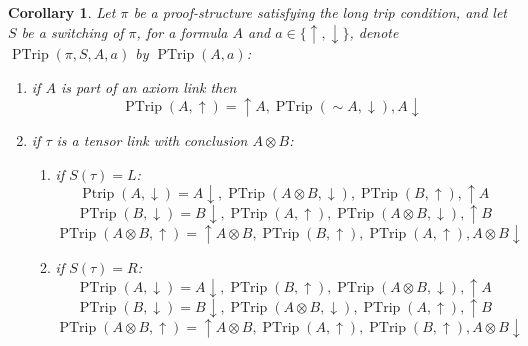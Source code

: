 \documentclass[12pt]{article}
\theoremstyle{plain}
\newtheorem{cor}[thm]{Corollary}
\theoremstyle{definition}
\newcommand{\negation}{\sim}
\begin{document}
\begin{cor}\label{cor:pretrip_innards}
Let $\pi$ be a proof-structure satisfying the long trip condition, and let $S$ be a switching of $\pi$, for a formula $A$ and $a \in \lbrace \uparrow, \downarrow\rbrace$, denote $\operatorname{PTrip}(\pi,S, A, a)$ by $\operatorname{PTrip}(A,a)$:
\begin{enumerate}
    \item if $A$ is part of an axiom link then
    \begin{equation}
        \operatorname{PTrip}(A,\uparrow) = \uparrow A, \operatorname{PTrip}(\negation A, \downarrow), A \downarrow
    \end{equation}
    \item if $\tau$ is a tensor link with conclusion $A \otimes B$:
    \begin{enumerate}
        \item if $S(\tau) = L$:
    \begin{equation}
        \operatorname{Ptrip}(A, \downarrow) = A\downarrow, \operatorname{PTrip}(A \otimes B, \downarrow), \operatorname{PTrip}(B, \uparrow), \uparrow A
    \end{equation}
    \begin{equation}
        \operatorname{PTrip}(B, \downarrow) = B\downarrow, \operatorname{PTrip}(A,\uparrow), \operatorname{PTrip}(A \otimes B, \downarrow), \uparrow B
    \end{equation}
    \begin{equation}
        \operatorname{PTrip}(A \otimes B, \uparrow) = \uparrow A \otimes B, \operatorname{PTrip}(B, \uparrow), \operatorname{PTrip}(A,\uparrow), A \otimes B \downarrow
    \end{equation}
        \item if $S(\tau) = R$:
    \begin{equation}
        \operatorname{PTrip}(A, \downarrow) = A\downarrow, \operatorname{PTrip}(B, \uparrow),\operatorname{PTrip}(A \otimes B, \downarrow), \uparrow A
    \end{equation}
    \begin{equation}
        \operatorname{PTrip}(B, \downarrow) = B\downarrow,  \operatorname{PTrip}(A \otimes B, \downarrow), \operatorname{PTrip}(A,\uparrow),\uparrow B
    \end{equation}
    \begin{equation}
        \operatorname{PTrip}(A \otimes B, \uparrow) = \uparrow A \otimes B,  \operatorname{PTrip}(A,\uparrow), \operatorname{PTrip}(B, \uparrow),A \otimes B \downarrow

\end{equation}
\end{enumerate}
\end{enumerate}
\end{cor}
\end{document}
